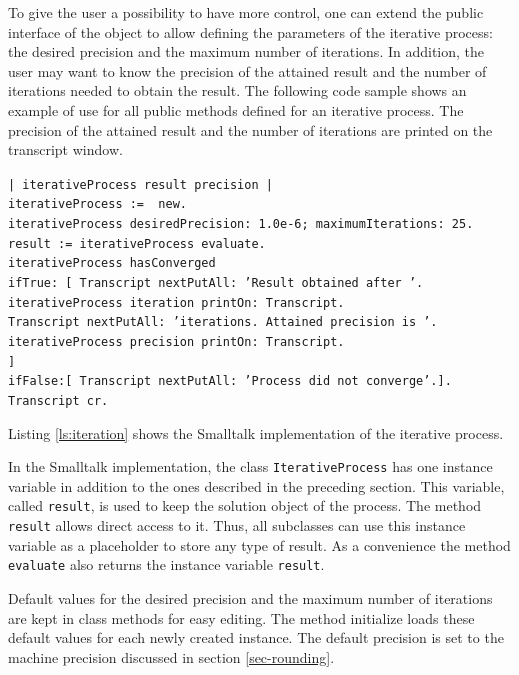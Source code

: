 \documentclass[twoside]{book}
\begin{document}
To give the user a possibility to have more control, one can
extend the public interface of the object to allow defining the
parameters of the iterative process: the desired precision and the
maximum number of iterations. In addition, the user may want to
know the precision of the attained result and the number of
iterations needed to obtain the result. The following code sample
shows an example of use for all public methods defined for an
iterative process. The precision of the attained result and the
number of iterations are printed on the transcript window.
\begin{codeExample}\hfil\break
{\tt | iterativeProcess result precision | \\ iterativeProcess :=
{\sl <a subclass of DhbIterativeProcess>} new.\\
 iterativeProcess
desiredPrecision: 1.0e-6; maximumIterations: 25.\\ result :=
iterativeProcess evaluate.\\ iterativeProcess hasConverged\\
    ifTrue: [ Transcript nextPutAll: 'Result obtained after '.\\
        iterativeProcess iteration printOn: Transcript.\\
        Transcript nextPutAll: 'iterations. Attained precision is
        '.\\
        iterativeProcess precision printOn: Transcript.\\
        ]\\
    ifFalse:[ Transcript nextPutAll: 'Process did not
    converge'.].\\
Transcript cr. }
\end{codeExample}
Listing \ref{ls:iteration} shows the Smalltalk implementation of
the iterative process.

In the Smalltalk implementation, the class {\tt IterativeProcess}
has one instance variable in addition to the ones described in the
preceding section. This variable, called {\tt result}, is used to
keep the solution object of the process. The method {\tt result}
allows direct access to it. Thus, all subclasses can use this
instance variable as a placeholder to store any type of result. As
a convenience the method {\tt evaluate} also returns the instance
variable {\tt result}.

Default values for the desired precision and the maximum number of
iterations are kept in class methods for easy editing. The method
initialize loads these default values for each newly created
instance. The default precision is set to the machine precision
discussed in section \ref{sec-rounding}.
\end{document}
